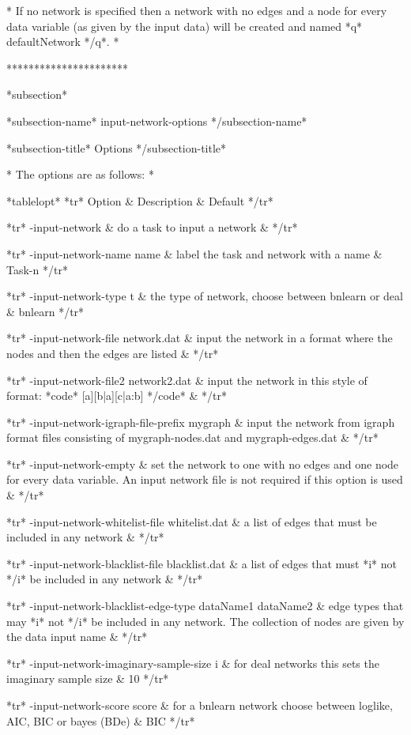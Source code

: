 * If no network is specified then a network with no edges and a node for every data variable (as given by the input data) will be created and named *q* defaultNetwork */q*. *

**********************

*subsection*

*subsection-name* input-network-options */subsection-name*

*subsection-title* Options */subsection-title*

* The options are as follows: *

*tablelopt* *tr* Option & Description & Default */tr*

*tr*
 -input-network  & do a task to input a network &
*/tr*

*tr*
  -input-network-name name & label the task and network with a name & Task-n
*/tr*

*tr*
  -input-network-type t & the type of network, choose between bnlearn or deal &  bnlearn
*/tr*

*tr*
  -input-network-file network.dat & input the network in a format where the nodes and then the edges are listed &
*/tr*

*tr*
  -input-network-file2 network2.dat & input the network in this style of format: *code* [a][b|a][c|a:b] */code* &
*/tr*

*tr*
  -input-network-igraph-file-prefix mygraph & input the network from igraph format files consisting of mygraph-nodes.dat and mygraph-edges.dat &
*/tr*

*tr*
  -input-network-empty & set the network to one with no edges and one node for every data variable. An input network file is not required if this option is used &
*/tr*

*tr*
  -input-network-whitelist-file whitelist.dat & a list of edges that must be included in any network &
*/tr*

*tr*
  -input-network-blacklist-file blacklist.dat & a list of edges that must *i* not */i* be included in any network &
*/tr*

*tr*
  -input-network-blacklist-edge-type dataName1 dataName2 & edge types that may *i* not */i* be included in any network. The collection of nodes are given by the data input name &
*/tr*

*tr*
  -input-network-imaginary-sample-size i & for deal networks this sets the imaginary sample size & 10
*/tr*

*tr*
  -input-network-score score & for a bnlearn network choose between loglike, AIC, BIC or bayes (BDe) & BIC
*/tr*

